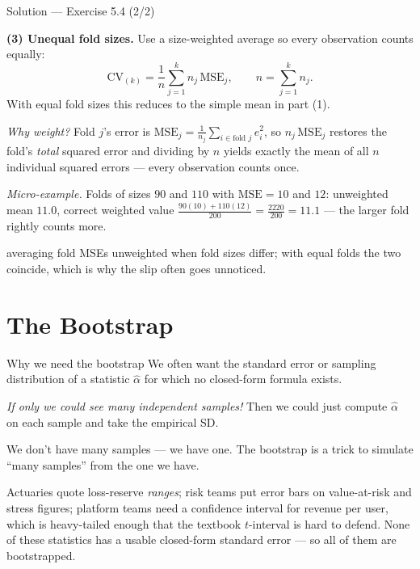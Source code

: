 \documentclass[aspectratio=169,11pt]{beamer}
\begin{document}
\begin{frame}{Solution --- Exercise 5.4 (2/2)}
  \begin{solutionbox}
    \textbf{(3) Unequal fold sizes.}
    Use a size-weighted average so every observation counts equally:
    \[
      \mathrm{CV}_{(k)} = \frac{1}{n}\sum_{j=1}^{k} n_j\,\mathrm{MSE}_j ,
      \qquad n = \sum_{j=1}^k n_j .
    \]
    With equal fold sizes this reduces to the simple mean in part (1).

    \emph{Why weight?} Fold $j$'s error is
    $\mathrm{MSE}_j = \tfrac{1}{n_j}\sum_{i \in \text{fold } j} e_i^2$,
    so $n_j\,\mathrm{MSE}_j$ restores the fold's \emph{total} squared
    error and dividing by $n$ yields exactly the mean of all $n$
    individual squared errors --- every observation counts once.

    \emph{Micro-example.} Folds of sizes $90$ and $110$ with
    $\mathrm{MSE} = 10$ and $12$: unweighted mean $11.0$, correct
    weighted value $\tfrac{90(10) + 110(12)}{200} = \tfrac{2220}{200}
    = 11.1$ --- the larger fold rightly counts more.
  \end{solutionbox}
  \begin{mistake}
    averaging fold MSEs unweighted when fold
    sizes differ; with equal folds the two coincide, which is why the
    slip often goes unnoticed.
  \end{mistake}
\end{frame}




\section{The Bootstrap}

\begin{frame}{Why we need the bootstrap}
  We often want the standard error or sampling distribution of a
  statistic $\hat\alpha$ for which no closed-form formula exists.
  \begin{takeaway}
    \emph{If only we could see many independent samples!} Then we
    could just compute $\hat\alpha$ on each sample and take the
    empirical SD.
  \end{takeaway}
  We don't have many samples --- we have one. The bootstrap is a
  trick to simulate ``many samples'' from the one we have.
  \begin{industry}
    Actuaries quote loss-reserve \emph{ranges}; risk teams put error bars
    on value-at-risk and stress figures; platform teams need a confidence
    interval for revenue per user, which is heavy-tailed enough that the
    textbook $t$-interval is hard to defend. None of these statistics has
    a usable closed-form standard error --- so all of them are
    bootstrapped.
  \end{industry}
\end{frame}
\end{document}
